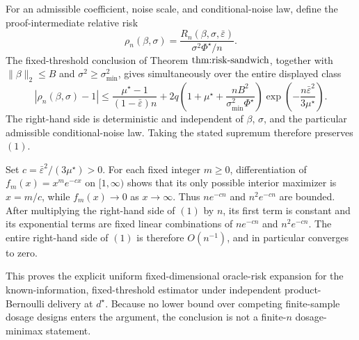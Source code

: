 For an admissible coefficient, noise scale, and conditional-noise law, define the proof-intermediate relative risk
\[
 \rho_n(\beta,\sigma)
 =\frac{R_n(\beta,\sigma,\bar\varepsilon)}{\sigma^2\Phi^\star/n}.
\]
The fixed-threshold conclusion of Theorem \(\textnormal{thm:risk-sandwich}\), together with \(\|\beta\|_2\le B\) and \(\sigma^2\ge\sigma_{\min}^2\), gives simultaneously over the entire displayed class
\[
 \left|\rho_n(\beta,\sigma)-1\right|
 \le
 \frac{\mu^\star-1}{(1-\bar\varepsilon)n}
 +2q\left(1+\mu^\star+
 \frac{nB^2}{\sigma_{\min}^2\Phi^\star}\right)
 \exp\!\left(-\frac{n\bar\varepsilon^2}{3\mu^\star}\right).
 \tag{1}
\]
The right-hand side is deterministic and independent of \(\beta\), \(\sigma\), and the particular admissible conditional-noise law.  Taking the stated supremum therefore preserves \((1)\).

Set \(c=\bar\varepsilon^2/(3\mu^\star)>0\).  For each fixed integer \(m\ge0\), differentiation of \(f_m(x)=x^me^{-cx}\) on \([1,\infty)\) shows that its only possible interior maximizer is \(x=m/c\), while \(f_m(x)\to0\) as \(x\to\infty\).  Thus \(ne^{-cn}\) and \(n^2e^{-cn}\) are bounded.  After multiplying the right-hand side of \((1)\) by \(n\), its first term is constant and its exponential terms are fixed linear combinations of \(ne^{-cn}\) and \(n^2e^{-cn}\).  The entire right-hand side of \((1)\) is therefore \(O(n^{-1})\), and in particular converges to zero.

This proves the explicit uniform fixed-dimensional oracle-risk expansion for the known-information, fixed-threshold estimator under independent product-Bernoulli delivery at \(d^\star\).  Because no lower bound over competing finite-sample dosage designs enters the argument, the conclusion is not a finite-\(n\) dosage-minimax statement.
